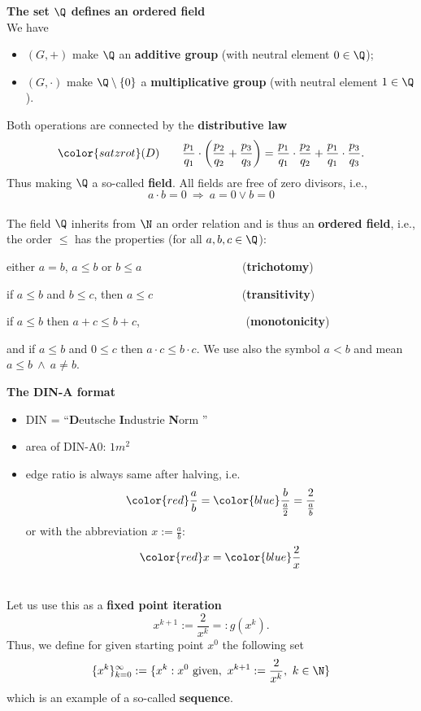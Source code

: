 {\textbf{\large The set $\Q$ defines an ordered field}\\
We have
\begin{itemize}
\item $(G,+)$ make $\Q$ an \textbf{additive group} (with neutral element $0\in\Q$);
\item $(G,\cdot)$ make $\Q\setminus\{0\}$ a \textbf{multiplicative group} (with neutral element $1\in \Q$).
\end{itemize}
Both operations are connected by the \textbf{distributive law}
\[\color{satzrot}
(D)\qquad \frac{p_1}{q_1}\cdot \left(\frac{p_2}{q_2}+\frac{p_3}{q_3}\right)=
\frac{p_1}{q_1}\cdot \frac{p_2}{q_2}+\frac{p_1}{q_1}\cdot \frac{p_3}{q_3}.
\]
Thus making $\Q$ a so-called \textbf{\textbf{field}}. All fields are free of zero divisors, i.e.,
\color{satzrot}
\[
a\cdot b=0\ \Rightarrow\  a=0\vee b=0
\]
%
~\\
\color{black}
The field $\Q$ inherits from $\N$ an order relation and is thus an \textbf{\textbf{ordered field}}, i.e., the order  $\le$ has the properties (for all $a,b,c\in\Q$):
\ite \color{defgruen}
\item[i)] either $a=b$, $a \le b$ or $b\le a$ ~~~~~~~~~~~~~~~~~(\textbf{trichotomy})
\item[ii)] if $a\le b$ and $b\le c$, then $a\le c$ ~~~~~~~~~~~~~~~(\textbf{transitivity})
\item[iii)]  if $a\le b$ then $a+c\le b+c$, ~~~~~~~~~~~~~~~~~~(\textbf{monotonicity})
\item[] and if $a\le b$ and $0\le c$ then $a\cdot c\le b\cdot c$.
\eti
We use also the symbol $a<b$ and mean $a\le b~\wedge ~a\neq b$.

\begin{frame} 
\label{realnumbers}
\textbf{The DIN-A format}\vspace{-0.15cm}
\begin{minipage}[c]{0.51\textwidth}
	\begin{itemize}
		\item DIN =   ``\textbf{D}eutsche \textbf{I}ndustrie \textbf{N}orm ''
		\item area of DIN-A0: $1m^2$
		\item edge ratio is always same after halving, i.e.
		\[
		{\color{red}\frac{a}{b}}={\color{blue}\frac{b}{\frac{a}{2}}=\frac{2}{\frac{a}{b}}}
		\]
		or with the abbreviation $x:=\frac{a}{b}$:
		\[
		{\color{red}x}={\color{blue}\frac{2}{x}}
		\]
	\end{itemize}
\end{minipage}
\begin{minipage}[c]{0.49\textwidth}
\end{minipage}
~\\
Let us use this as a \textbf{fixed point iteration}
\[
x^{k+1}:=\frac{2}{x^{k}} =: g(x^k).
\]
Thus, we define for given starting point $x^0$ the following set
\[
\{x^k\}_{k=0}^\infty:=\{x^k: x^0 \text{ given},~ x^{k+1}:=\frac{2}{x^{k}},~k\in\N\}
\]
which is an example of a so-called \textbf{\textbf{sequence}}.
\end{frame}


}

